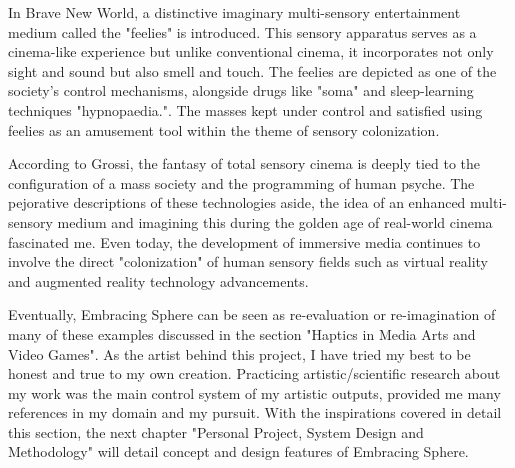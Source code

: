                 In Brave New World, a distinctive imaginary multi-sensory entertainment medium called the "feelies" is introduced. This sensory apparatus serves as a cinema-like experience but unlike conventional cinema, it incorporates not only sight and sound but also smell and touch. The feelies are depicted as one of the society's control mechanisms, alongside drugs like "soma" and sleep-learning techniques "hypnopaedia."\cite{Pleasure_of_Modernism}. The masses kept under control and satisfied using feelies as an amusement tool within the theme of sensory colonization\cite{Feelies}.\par

                According to Grossi\cite{Feelies}, the fantasy of total sensory cinema is deeply tied to the configuration of a mass society and the programming of human psyche. The pejorative descriptions of these technologies aside, the idea of an enhanced multi-sensory medium and imagining this during the golden age of real-world cinema fascinated me. Even today, the development of immersive media continues to involve the direct "colonization" of human sensory fields such as virtual reality and augmented reality technology advancements.\par

                Eventually, Embracing Sphere can be seen as re-evaluation or re-imagination of many of these examples discussed in the section "Haptics in Media Arts and Video Games". As the artist behind this project, I have tried my best to be honest and true to my own creation. Practicing artistic/scientific research about my work was the main control system of my artistic outputs, provided me many references in my domain and my pursuit. With the inspirations covered in detail this section, the next chapter "Personal Project, System Design and Methodology" will detail concept and design features of Embracing Sphere.\par
